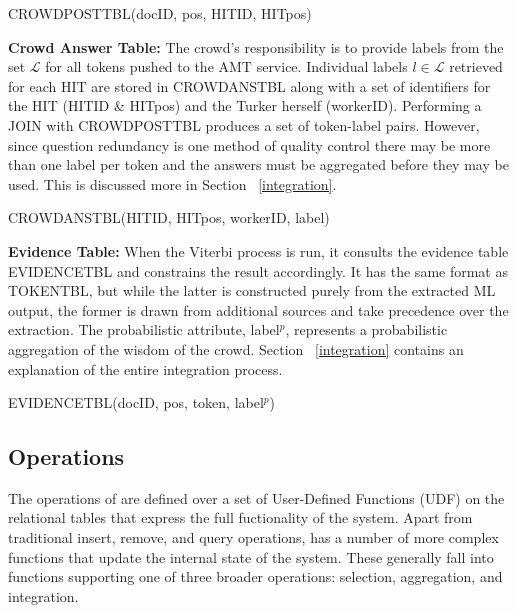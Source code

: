 \vspace{.1in}
\centerline{C{\small ROWD}P{\small OST}T{\small BL}(docID, pos, HITID, HITpos)}
\vspace{.1in}

\noindent\textbf{Crowd Answer Table:} The crowd's responsibility is to provide labels from the set $\mathcal{L}$ for all tokens pushed to the AMT service.  Individual labels $l\in\mathcal{L}$ retrieved for each HIT are stored in C{\small ROWD}A{\small NS}T{\small BL} along with a set of identifiers for the HIT (HITID \& HITpos) and the Turker herself (workerID).  Performing a JOIN with C{\small ROWD}P{\small OST}T{\small BL} produces a set of token-label pairs.  However, since question redundancy is one method of quality control there may be more than one label per token and the answers must be aggregated before they may be used.  This is discussed more in Section ~\ref{integration}.

\vspace{.1in}
\centerline{C{\small ROWD}A{\small NS}T{\small BL}(HITID, HITpos, workerID, label)}
\vspace{.1in}

\noindent\textbf{Evidence Table:} When the Viterbi process is run, it consults the evidence table E{\small VIDENCE}T{\small BL} and constrains the result accordingly.  It has the same format as T{\small OKEN}T{\small BL}, but while the latter is constructed purely from the extracted ML output, the former is drawn from additional sources and take precedence over the extraction.  The probabilistic attribute, label$^{p}$, represents a probabilistic aggregation of the wisdom of the crowd.  Section ~\ref{integration} contains an explanation of the entire integration process.

\vspace{.1in}
\centerline{E{\small VIDENCE}T{\small BL}(docID, pos, token, label$^{p}$)}
\vspace{.1in}

\subsection{\sysName Operations}

The operations of \sysName are defined over a set of User-Defined Functions (UDF) on the relational tables that express the full fuctionality of the system.  Apart from traditional insert, remove, and query operations, \sysName has a number of more complex functions that update the internal state of the system.  These generally fall into functions supporting one of three broader operations: selection, aggregation, and integration.

